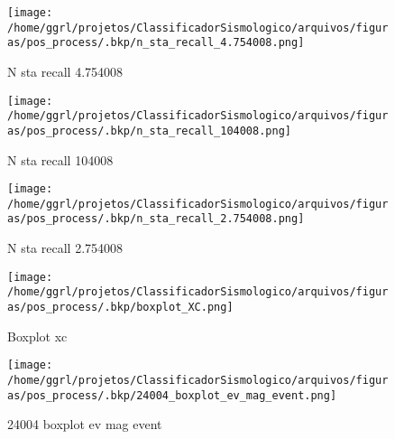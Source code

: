                     \begin{figure}[H]
                        \centering
                        \texttt{[image: /home/ggrl/projetos/ClassificadorSismologico/arquivos/figuras/pos\_process/.bkp/n\_sta\_recall\_4.754008.png]}
                        \caption{N sta recall 4.754008}
                        \label{fig:n_sta_recall_4.754008}
                    \end{figure}
                

                    \begin{figure}[H]
                        \centering
                        \texttt{[image: /home/ggrl/projetos/ClassificadorSismologico/arquivos/figuras/pos\_process/.bkp/n\_sta\_recall\_104008.png]}
                        \caption{N sta recall 104008}
                        \label{fig:n_sta_recall_104008}
                    \end{figure}
                

                    \begin{figure}[H]
                        \centering
                        \texttt{[image: /home/ggrl/projetos/ClassificadorSismologico/arquivos/figuras/pos\_process/.bkp/n\_sta\_recall\_2.754008.png]}
                        \caption{N sta recall 2.754008}
                        \label{fig:n_sta_recall_2.754008}
                    \end{figure}
                

                    \begin{figure}[H]
                        \centering
                        \texttt{[image: /home/ggrl/projetos/ClassificadorSismologico/arquivos/figuras/pos\_process/.bkp/boxplot\_XC.png]}
                        \caption{Boxplot xc}
                        \label{fig:boxplot_XC}
                    \end{figure}
                

                    \begin{figure}[H]
                        \centering
                        \texttt{[image: /home/ggrl/projetos/ClassificadorSismologico/arquivos/figuras/pos\_process/.bkp/24004\_boxplot\_ev\_mag\_event.png]}
                        \caption{24004 boxplot ev mag event}
                        \label{fig:24004_boxplot_ev_mag_event}
                    \end{figure}
                

